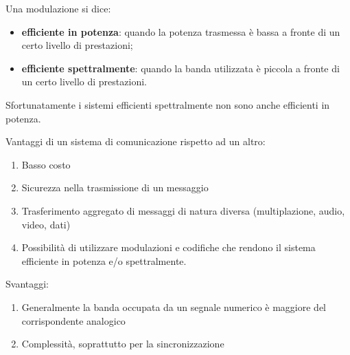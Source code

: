 Una modulazione si dice:
\begin{itemize}
\item \textbf{efficiente in potenza}: quando la potenza trasmessa è bassa a fronte di un certo livello di prestazioni;
\item \textbf{efficiente spettralmente}: quando la banda utilizzata è piccola a fronte di un certo livello di prestazioni.
\end{itemize}

Sfortunatamente i sistemi efficienti spettralmente non sono anche efficienti in potenza.

Vantaggi di un sistema di comunicazione rispetto ad un altro:
\begin{enumerate}
\item Basso costo
\item Sicurezza nella trasmissione di un messaggio
\item Trasferimento aggregato di messaggi di natura diversa (multiplazione, audio, video, dati)
\item Possibilità di utilizzare modulazioni e codifiche che rendono il sistema efficiente in potenza e/o spettralmente.
\end{enumerate}

Svantaggi:
\begin{enumerate}
\item Generalmente la banda occupata da un segnale numerico è maggiore del corrispondente analogico
\item Complessità, soprattutto per la sincronizzazione
\end{enumerate}

